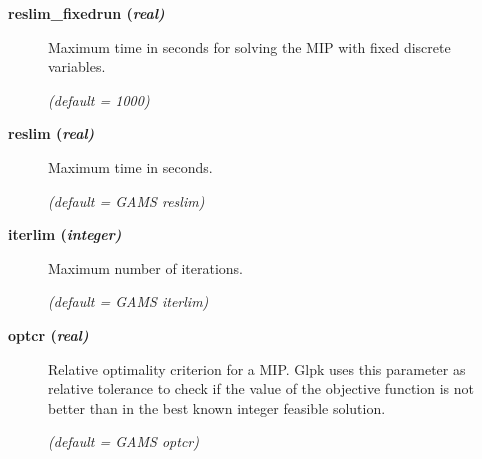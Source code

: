 \begin{description}
\item[\label{reslim_fixedrun}\hypertarget{reslim_fixedrun}
{\textbf{reslim\_fixedrun (\slshape{real})}}]\hspace{1.0in}

Maximum time in seconds for solving the MIP with fixed discrete variables.

\textsl{(default = 1000)}

\item[\label{glpkreslim}\hypertarget{glpkreslim}
{\textbf{reslim (\slshape{real})}}]\hspace{1.0in}

Maximum time in seconds.

\textsl{(default = GAMS reslim)}

\item[\label{glpkiterlim}\hypertarget{glpkiterlim}
{\textbf{iterlim (\slshape{integer})}}]\hspace{1.0in}

Maximum number of iterations.

\textsl{(default = GAMS iterlim)}

\item[\label{glpkoptcr}\hypertarget{glpkoptcr}
{\textbf{optcr (\slshape{real})}}]\hspace{1.0in}

Relative optimality criterion for a MIP.
Glpk uses this parameter as relative tolerance to check if the value of the objective function is not better than in the best known integer feasible solution.

\textsl{(default = GAMS optcr)}
\end{description}
